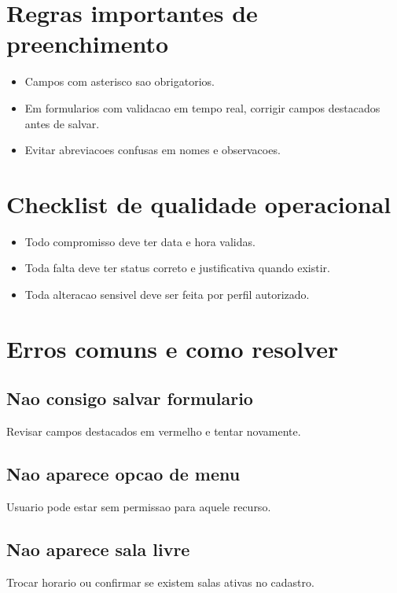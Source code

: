\documentclass[12pt,a4paper]{article}
\begin{document}
\section{Regras importantes de preenchimento}
\begin{itemize}[leftmargin=*]
\item Campos com asterisco sao obrigatorios.
\item Em formularios com validacao em tempo real, corrigir campos destacados antes de salvar.
\item Evitar abreviacoes confusas em nomes e observacoes.
\end{itemize}

\section{Checklist de qualidade operacional}
\begin{itemize}[leftmargin=*]
\item Todo compromisso deve ter data e hora validas.
\item Toda falta deve ter status correto e justificativa quando existir.
\item Toda alteracao sensivel deve ser feita por perfil autorizado.
\end{itemize}

\section{Erros comuns e como resolver}
\subsection{Nao consigo salvar formulario}
Revisar campos destacados em vermelho e tentar novamente.

\subsection{Nao aparece opcao de menu}
Usuario pode estar sem permissao para aquele recurso.

\subsection{Nao aparece sala livre}
Trocar horario ou confirmar se existem salas ativas no cadastro.
\end{document}
